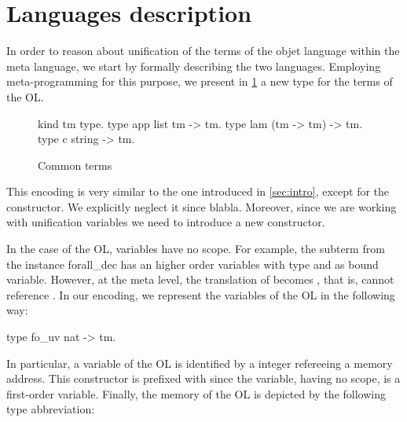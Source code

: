 \documentclass[sigconf,natbib=false]{acmart}
\begin{document}
\section{Languages description}
\label{sec:lang-spec}

% 


\def\eqfo{eq\_fo\xspace}

In order to reason about unification of the terms of the objet language within the
meta language, we start by formally describing the two languages. Employing
meta-programming for this purpose, we present in \cref{code:common-terms} a new type for the terms of
the OL.
%
\setlength{\abovecaptionskip}{0pt}
\setlength{\belowcaptionskip}{-13pt}

\begin{figure}[H]
  \begin{elpicode}
    kind tm type.
    type app list tm -> tm.
    type lam (tm -> tm) -> tm.
    type c   string -> tm.
  \end{elpicode}
  \caption{Common terms}
  \label{code:common-terms}
\end{figure}
%
\noindent
This encoding is very similar to the one introduced in \cref{sec:intro}, except
for the  constructor. We explicitly neglect it since blabla.
Moreover, since we are working with unification variables we need to introduce a
new constructor. 

In the case of the OL, variables have no scope. For example, the subterm
 from the instance forall\_dec has  an higher order
variables with type  and  as bound variable. 
However, at the meta level, the translation of  becomes
, that is,  cannot reference . In our
encoding, we represent the variables of the OL in the following way:

\begin{elpicode}
  type fo_uv nat -> tm.
\end{elpicode}

\noindent 
In particular, a variable of the OL is identified by a integer
refereeing a memory address. This constructor is prefixed with  since
the variable, having no scope, is a first-order variable. Finally, the memory of
the OL is depicted by the following type abbreviation:
\end{document}
